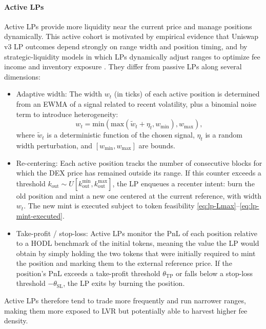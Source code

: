 \documentclass[11pt]{article}
\begin{document}
\paragraph{Active LPs}
Active LPs provide more liquidity near the current price and manage positions dynamically. This active cohort is motivated by empirical evidence that Uniswap v3 LP outcomes depend strongly on range width and position timing, and by strategic-liquidity models in which LPs dynamically adjust ranges to optimize fee income and inventory exposure \cite{heimbach2022,fan2023}. They differ
from passive LPs along several dimensions:
\begin{itemize}[leftmargin=*]
  \item Adaptive width: The width $w_t$ (in ticks) of each active position is determined from an
  EWMA of a signal related to recent volatility, plus a binomial noise term to introduce heterogeneity:
  \begin{equation}
    w_t = \mathrm{min}\left(\mathrm{max}(\tilde w_t + \eta_t,w_{\min}),w_{\max}\right),
    \label{eq:active-width}
  \end{equation}
  where $\tilde w_t$ is a deterministic function of the chosen signal, $\eta_t$ is a random width
  perturbation, and $[w_{\min},w_{\max}]$ are bounds.
  \item Re-centering: Each active position tracks the number of consecutive blocks for which the
  DEX price has remained outside its range. If this counter exceeds a threshold
  $k_{\mathrm{out}} \sim U[k^{\min}_{\mathrm{out}},k^{\max}_{\mathrm{out}}]$, the LP enqueues a recenter intent:
  burn the old position and mint a new one centered at the current reference, with width $w_t$.
  The new mint is executed subject to token feasibility \eqref{eq:lp-Lmax}--\eqref{eq:lp-mint-executed}.
  \item Take-profit / stop-loss: Active LPs monitor the PnL of each position relative to a HODL
  benchmark of the initial tokens, meaning the value the LP would obtain by simply holding the two tokens that were initially required to mint the position and marking them to the external reference price. If the position's PnL exceeds a take-profit threshold
  $\theta_{\mathrm{TP}}$ or falls below a stop-loss threshold $-\theta_{\mathrm{SL}}$, the LP exits by burning
  the position.
\end{itemize}
Active LPs therefore tend to trade more frequently and run narrower ranges, making them more exposed to
LVR but potentially able to harvest higher fee density.
\end{document}
